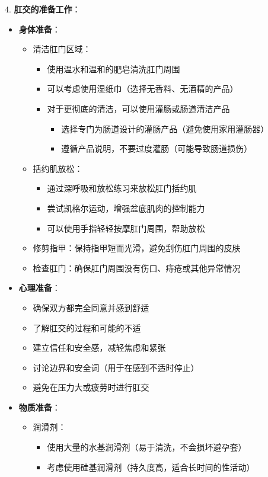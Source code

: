 \documentclass[12pt,UTF8]{ctexbook}
\begin{document}
4. \textbf{肛交的准备工作}：
\begin{itemize}
	\item \textbf{身体准备}：
	\begin{itemize}
		\item 清洁肛门区域：
		\begin{itemize}
			\item 使用温水和温和的肥皂清洗肛门周围
			\item 可以考虑使用湿纸巾（选择无香料、无酒精的产品）
			\item 对于更彻底的清洁，可以使用灌肠或肠道清洁产品
			\begin{itemize}
				\item 选择专门为肠道设计的灌肠产品（避免使用家用灌肠器）
				\item 遵循产品说明，不要过度灌肠（可能导致肠道损伤）
			\end{itemize}
		\end{itemize}
		\item 括约肌放松：
		\begin{itemize}
			\item 通过深呼吸和放松练习来放松肛门括约肌
			\item 尝试凯格尔运动，增强盆底肌肉的控制能力
			\item 可以使用手指轻轻按摩肛门周围，帮助放松
		\end{itemize}
		\item 修剪指甲：保持指甲短而光滑，避免刮伤肛门周围的皮肤
		\item 检查肛门：确保肛门周围没有伤口、痔疮或其他异常情况
	\end{itemize}
	\item \textbf{心理准备}：
	\begin{itemize}
		\item 确保双方都完全同意并感到舒适
		\item 了解肛交的过程和可能的不适
		\item 建立信任和安全感，减轻焦虑和紧张
		\item 讨论边界和安全词（用于在感到不适时停止）
		\item 避免在压力大或疲劳时进行肛交
	\end{itemize}
	\item \textbf{物质准备}：
	\begin{itemize}
		\item 润滑剂：
		\begin{itemize}
			\item 使用大量的水基润滑剂（易于清洗，不会损坏避孕套）
			\item 考虑使用硅基润滑剂（持久度高，适合长时间的性活动）

\end{itemize}
\end{itemize}
\end{itemize}
\end{document}

